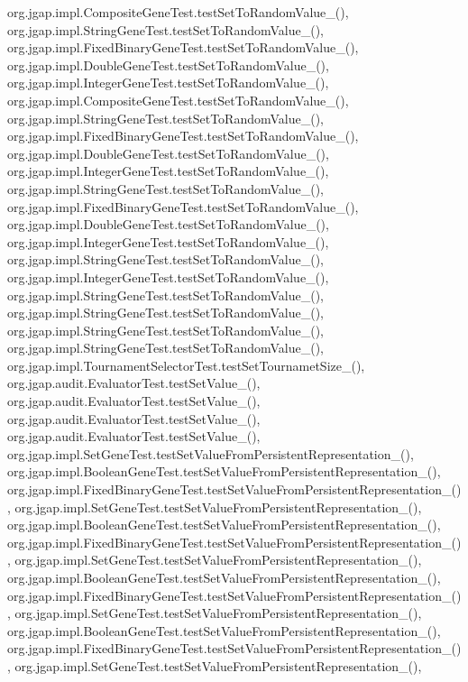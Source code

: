 org.\-jgap.\-impl.\-Composite\-Gene\-Test.\-test\-Set\-To\-Random\-Value\-\_(), org.\-jgap.\-impl.\-String\-Gene\-Test.\-test\-Set\-To\-Random\-Value\-\_(), org.\-jgap.\-impl.\-Fixed\-Binary\-Gene\-Test.\-test\-Set\-To\-Random\-Value\-\_(), org.\-jgap.\-impl.\-Double\-Gene\-Test.\-test\-Set\-To\-Random\-Value\-\_(), org.\-jgap.\-impl.\-Integer\-Gene\-Test.\-test\-Set\-To\-Random\-Value\-\_(), org.\-jgap.\-impl.\-Composite\-Gene\-Test.\-test\-Set\-To\-Random\-Value\-\_(), org.\-jgap.\-impl.\-String\-Gene\-Test.\-test\-Set\-To\-Random\-Value\-\_(), org.\-jgap.\-impl.\-Fixed\-Binary\-Gene\-Test.\-test\-Set\-To\-Random\-Value\-\_(), org.\-jgap.\-impl.\-Double\-Gene\-Test.\-test\-Set\-To\-Random\-Value\-\_(), org.\-jgap.\-impl.\-Integer\-Gene\-Test.\-test\-Set\-To\-Random\-Value\-\_(), org.\-jgap.\-impl.\-String\-Gene\-Test.\-test\-Set\-To\-Random\-Value\-\_(), org.\-jgap.\-impl.\-Fixed\-Binary\-Gene\-Test.\-test\-Set\-To\-Random\-Value\-\_(), org.\-jgap.\-impl.\-Double\-Gene\-Test.\-test\-Set\-To\-Random\-Value\-\_(), org.\-jgap.\-impl.\-Integer\-Gene\-Test.\-test\-Set\-To\-Random\-Value\-\_(), org.\-jgap.\-impl.\-String\-Gene\-Test.\-test\-Set\-To\-Random\-Value\-\_(), org.\-jgap.\-impl.\-Integer\-Gene\-Test.\-test\-Set\-To\-Random\-Value\-\_(), org.\-jgap.\-impl.\-String\-Gene\-Test.\-test\-Set\-To\-Random\-Value\-\_(), org.\-jgap.\-impl.\-String\-Gene\-Test.\-test\-Set\-To\-Random\-Value\-\_(), org.\-jgap.\-impl.\-String\-Gene\-Test.\-test\-Set\-To\-Random\-Value\-\_(), org.\-jgap.\-impl.\-String\-Gene\-Test.\-test\-Set\-To\-Random\-Value\-\_(), org.\-jgap.\-impl.\-Tournament\-Selector\-Test.\-test\-Set\-Tournamet\-Size\-\_(), org.\-jgap.\-audit.\-Evaluator\-Test.\-test\-Set\-Value\-\_(), org.\-jgap.\-audit.\-Evaluator\-Test.\-test\-Set\-Value\-\_(), org.\-jgap.\-audit.\-Evaluator\-Test.\-test\-Set\-Value\-\_(), org.\-jgap.\-audit.\-Evaluator\-Test.\-test\-Set\-Value\-\_(), org.\-jgap.\-impl.\-Set\-Gene\-Test.\-test\-Set\-Value\-From\-Persistent\-Representation\-\_(), org.\-jgap.\-impl.\-Boolean\-Gene\-Test.\-test\-Set\-Value\-From\-Persistent\-Representation\-\_(), org.\-jgap.\-impl.\-Fixed\-Binary\-Gene\-Test.\-test\-Set\-Value\-From\-Persistent\-Representation\-\_(), org.\-jgap.\-impl.\-Set\-Gene\-Test.\-test\-Set\-Value\-From\-Persistent\-Representation\-\_(), org.\-jgap.\-impl.\-Boolean\-Gene\-Test.\-test\-Set\-Value\-From\-Persistent\-Representation\-\_(), org.\-jgap.\-impl.\-Fixed\-Binary\-Gene\-Test.\-test\-Set\-Value\-From\-Persistent\-Representation\-\_(), org.\-jgap.\-impl.\-Set\-Gene\-Test.\-test\-Set\-Value\-From\-Persistent\-Representation\-\_(), org.\-jgap.\-impl.\-Boolean\-Gene\-Test.\-test\-Set\-Value\-From\-Persistent\-Representation\-\_(), org.\-jgap.\-impl.\-Fixed\-Binary\-Gene\-Test.\-test\-Set\-Value\-From\-Persistent\-Representation\-\_(), org.\-jgap.\-impl.\-Set\-Gene\-Test.\-test\-Set\-Value\-From\-Persistent\-Representation\-\_(), org.\-jgap.\-impl.\-Boolean\-Gene\-Test.\-test\-Set\-Value\-From\-Persistent\-Representation\-\_(), org.\-jgap.\-impl.\-Fixed\-Binary\-Gene\-Test.\-test\-Set\-Value\-From\-Persistent\-Representation\-\_(), org.\-jgap.\-impl.\-Set\-Gene\-Test.\-test\-Set\-Value\-From\-Persistent\-Representation\-\_(), 